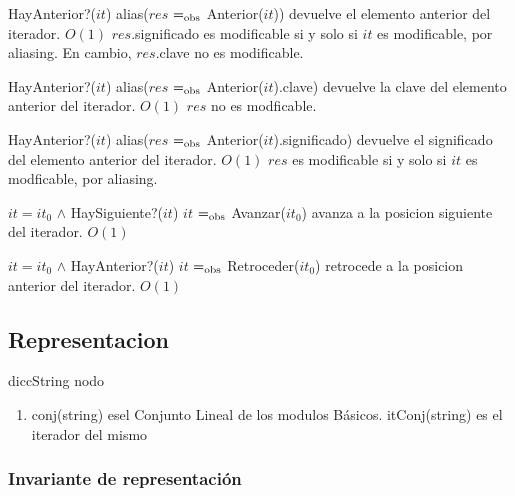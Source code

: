   {HayAnterior?($it$)}
  {alias($res$ $=_{\mathrm{obs}}$ Anterior($it$))}
  {devuelve el elemento anterior del iterador.}
  {$O(1)$}
  {$res$.significado es modificable si y solo si $it$ es modificable, por aliasing. En cambio, $res$.clave no es modificable.}

  {HayAnterior?($it$)}
  {alias($res$ $=_{\mathrm{obs}}$ Anterior($it$).clave)}
  {devuelve la clave del elemento anterior del iterador.}
  {$O(1)$}
  {$res$ no es modficable.}

  {HayAnterior?($it$)}
  {alias($res$ $=_{\mathrm{obs}}$ Anterior($it$).significado)}
  {devuelve el significado del elemento anterior del iterador.}
  {$O(1)$}
  {$res$ es modificable si y solo si $it$ es modficable, por aliasing.}


  {$it = it_0$ $\land$ HaySiguiente?($it$)}
  {$it$ $=_{\mathrm{obs}}$ Avanzar($it_0$)}
  {avanza a la posicion siguiente del iterador.}
  {$O(1)$}
  {}

  {$it = it_0$ $\land$ HayAnterior?($it$)}
  {$it$ $=_{\mathrm{obs}}$ Retroceder($it_0$)}
  {retrocede a la posicion anterior del iterador.}
  {$O(1)$}
  {}



\subsection{Representacion}
diccString
nodo

\begin{enumerate}
\item conj(string) esel Conjunto Lineal de los modulos Básicos. itConj(string) es el iterador del mismo

\end{enumerate}

\subsubsection*{Invariante de representación}


